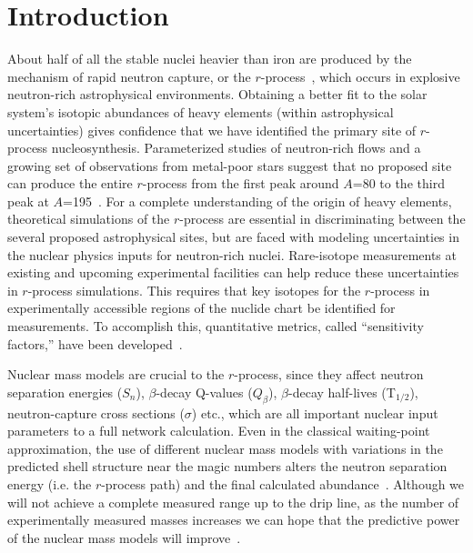 \documentclass[aps,prc,reprint,showpacs,floatfix,nofootinbib]{revtex4-1}
\begin{document}
\section{Introduction}
About half of all the stable nuclei heavier than iron are produced by the mechanism of rapid neutron capture, or the $r$-process~\cite{1957RvMP...29..547B, 1957AJ.....62....9C}, which occurs in explosive neutron-rich astrophysical environments. Obtaining a better fit to the solar system's isotopic abundances of heavy elements (within astrophysical uncertainties) gives confidence that we have identified the primary site of $r$-process nucleosynthesis. Parameterized studies of neutron-rich flows and a growing set of observations from metal-poor stars suggest that no proposed site can produce the entire $r$-process from the first peak around $A$=80 to the third peak at $A$=195~\cite{2003ApJ...588.1099Q, doi:10.1146/annurev.astro.46.060407.145207}.  For a complete understanding of the origin of heavy elements, theoretical simulations of the $r$-process are essential in discriminating between the several proposed astrophysical sites, but are faced with modeling uncertainties in the nuclear physics inputs for neutron-rich nuclei. Rare-isotope measurements at existing and upcoming experimental facilities can help reduce these uncertainties in $r$-process simulations. This requires that key isotopes for the $r$-process in experimentally accessible regions of the nuclide chart be identified for measurements. To accomplish this, quantitative metrics, called ``sensitivity factors,'' have been developed~\citep{PhysRevC.92.035807,2012EPJA...48..184B,2012PhRvC..86c5803M}. 

Nuclear mass models are crucial to the $r$-process, since they affect neutron separation energies ($S_n$), $\beta$-decay Q-values ($Q_{\beta}$), 
$\beta$-decay half-lives (T$_\textrm{1/2}$), neutron-capture cross 
sections ($\sigma$) etc., which are all 
important nuclear input parameters to a full network calculation. Even in the classical waiting-point approximation, the use of different nuclear mass models with variations in the predicted shell structure near the magic numbers alters the neutron separation energy (i.e. the $r$-process path) and the final calculated abundance~\cite{2015PhRvC..92c5807M}. 
Although we will not achieve a complete measured range up to the drip line, as the number of experimentally measured masses increases we can hope that the 
predictive power of the nuclear mass models will improve~\cite{2014PhRvC..90a7302S}. 
\end{document}
